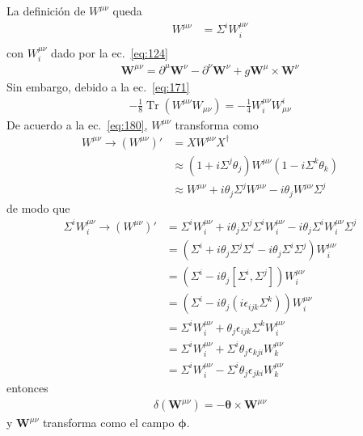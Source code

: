La definici\'on de $W^{\mu\nu}$ queda
\begin{align}
    W^{\mu\nu}&=\Sigma^iW^{\mu\nu}_i\nonumber\\
\end{align}
con $W^{\mu\nu}_i$ dado por la ec.~\eqref{eq:124}
\begin{align}
    \mathbf{W}^{\mu\nu}=\partial^\mu \mathbf{W}^\nu -\partial^\nu \mathbf{W}^\nu+g\mathbf{W}^\mu\times\mathbf{W}^\nu
\end{align}
Sin embargo, debido a la ec.~\eqref{eq:171}
\begin{align}
  \label{eq:179}
  -\frac{1}{8}\operatorname{Tr}(W^{\mu\nu}W_{\mu\nu})=-\frac{1}{4}W^{\mu\nu}_iW_{\mu\nu}^i
\end{align}
De acuerdo a la ec.~\eqref{eq:180}, ${W}^{\mu\nu}$ transforma como
\begin{align}
  W^{\mu\nu}\to(W^{\mu\nu})'&=XW^{\mu\nu}X^\dagger\nonumber\\
  &\approx(1+i\Sigma^j\theta_j)W^{\mu\nu}(1-i\Sigma^k\theta_k)\nonumber\\
  &\approx W^{\mu\nu}+i\theta_j\Sigma^jW^{\mu\nu}-i\theta_jW^{\mu\nu}\Sigma^j\nonumber
\end{align}
de modo que
\begin{align}
    \Sigma^iW^{\mu\nu}_i\to(W^{\mu\nu})'&=\Sigma^iW^{\mu\nu}_i+i\theta_j\Sigma^j\Sigma^iW^{\mu\nu}_i-i\theta_j\Sigma^iW^{\mu\nu}_i\Sigma^j\nonumber\\
    &=(\Sigma^i+i\theta_j\Sigma^j\Sigma^i-i\theta_j\Sigma^i\Sigma^j)W^{\mu\nu}_i\nonumber\\
    &=(\Sigma^i-i\theta_j[\Sigma^i,\Sigma^j])W^{\mu\nu}_i\nonumber\\
    &=(\Sigma^i-i\theta_j(i\epsilon_{ijk}\Sigma^k))W^{\mu\nu}_i\nonumber\\
    &=\Sigma^iW^{\mu\nu}_i+\theta_j\epsilon_{ijk}\Sigma^kW^{\mu\nu}_i\nonumber\\
    &=\Sigma^iW^{\mu\nu}_i+\Sigma^i\theta_j\epsilon_{kji}W^{\mu\nu}_k\nonumber\\
    &=\Sigma^iW^{\mu\nu}_i-\Sigma^i\theta_j\epsilon_{jki}W^{\mu\nu}_k\nonumber
\end{align}
entonces
\begin{align}
  \delta(\mathbf{W}^{\mu\nu})=-\boldsymbol{\theta}\times\mathbf{W}^{\mu\nu}
\end{align}
y $\mathbf{W}^{\mu\nu}$ transforma como el campo $\boldsymbol{\phi}$.

